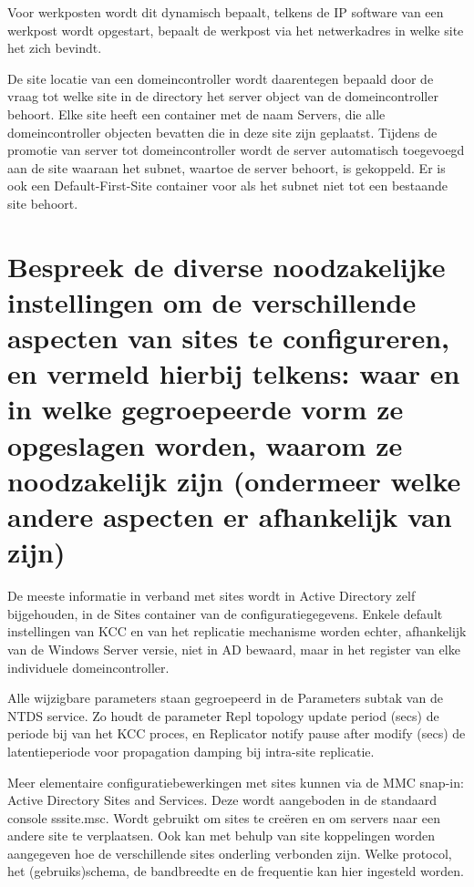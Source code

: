 Voor werkposten wordt dit dynamisch bepaalt, telkens de IP software van een
werkpost wordt opgestart, bepaalt de werkpost via het netwerkadres in welke site
het zich bevindt.

De site locatie van een domeincontroller wordt daarentegen bepaald door de vraag
tot welke site in de directory het server object van de domeincontroller
behoort. Elke site heeft een container met de naam Servers, die alle
domeincontroller objecten bevatten die in deze site zijn geplaatst. Tijdens de
promotie van server tot domeincontroller wordt de server automatisch toegevoegd
aan de site waaraan het subnet, waartoe de server behoort, is gekoppeld. Er is
ook een Default-First-Site container voor als het subnet niet tot een bestaande
site behoort.

\section{Bespreek de diverse noodzakelijke instellingen om de verschillende
aspecten van sites te configureren, en vermeld hierbij telkens: waar en in welke
gegroepeerde vorm ze opgeslagen worden, waarom ze noodzakelijk zijn (ondermeer
welke andere aspecten er afhankelijk van zijn)}

De meeste informatie in verband met sites wordt in Active Directory zelf
bijgehouden, in de Sites container van de configuratiegegevens. Enkele default
instellingen van KCC en van het replicatie mechanisme worden echter, afhankelijk
van de Windows Server versie, niet in AD bewaard, maar in het register van elke
individuele domeincontroller.

Alle wijzigbare parameters staan gegroepeerd in de Parameters subtak van de NTDS
service. Zo houdt de parameter Repl topology update period (secs) de periode bij
van het KCC proces, en Replicator notify pause after modify (secs) de
latentieperiode voor propagation damping bij intra-site replicatie.

Meer elementaire configuratiebewerkingen met sites kunnen via de MMC snap-in:
Active Directory Sites and Services. Deze wordt aangeboden in de standaard
console sssite.msc. Wordt gebruikt om sites te creëren en om servers naar een
andere site te verplaatsen. Ook kan met behulp van site koppelingen worden
aangegeven hoe de verschillende sites onderling verbonden zijn. Welke protocol,
het (gebruiks)schema, de bandbreedte en de frequentie kan hier ingesteld worden.
